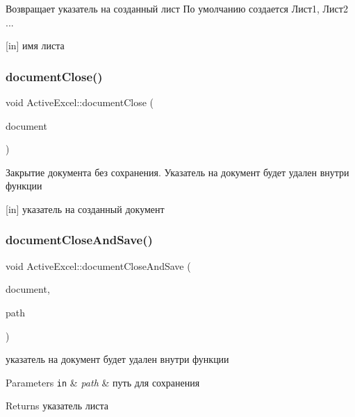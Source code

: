 Возвращает указатель на созданный лист По умолчанию создается Лист1, Лист2 ... 

\mbox{[}in\mbox{]} имя листа \mbox{\label{class_active_excel_a7be6d6cfc05409fd23d9ae0dff95353b}} 
\subsubsection{\texorpdfstring{document\+Close()}{documentClose()}}
{\footnotesize\ttfamily void Active\+Excel\+::document\+Close (\begin{DoxyParamCaption}\item[{Q\+Ax\+Object $\ast$}]{document }\end{DoxyParamCaption})}



Закрытие документа без сохранения. Указатель на документ будет удален внутри функции 

\mbox{[}in\mbox{]} указатель на созданный документ \mbox{\label{class_active_excel_ab3bf3535715a62ca818013cd9d8cd05a}} 
\subsubsection{\texorpdfstring{document\+Close\+And\+Save()}{documentCloseAndSave()}}
{\footnotesize\ttfamily void Active\+Excel\+::document\+Close\+And\+Save (\begin{DoxyParamCaption}\item[{Q\+Ax\+Object $\ast$}]{document,  }\item[{Q\+Variant}]{path }\end{DoxyParamCaption})}



указатель на документ будет удален внутри функции 


\begin{DoxyParams}[1]{Parameters}
\mbox{\tt in}  & {\em path} & путь для сохранения \\
\hline
\end{DoxyParams}
\begin{DoxyReturn}{Returns}
указатель листа 
\end{DoxyReturn}
\mbox{\label{class_active_excel_a64a459d7894744a4e879670db82692f7}} 
